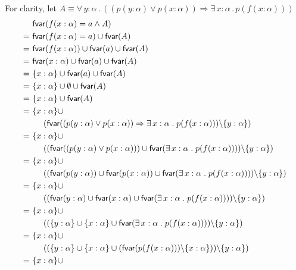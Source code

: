 \documentclass[11pt,fleqn]{article}
\newcommand{\mname}[1]{\mbox{\sf #1}}
\renewcommand{\And}{\wedge}
\newcommand{\And}{\wedge}
\newcommand{\Or}{\vee}
\newcommand{\Implies}{\Rightarrow}
\newcommand{\ForallApp}{\forall\,}
\newcommand{\ForsomeApp}{\exists\,}
\newcommand{\mdot}{\mathrel.}
\begin{document}
      For clarity, let $A \equiv \ForallApp y : \alpha \mdot ((p(y:\alpha) \Or p(x:\alpha)) \Implies \ForsomeApp x : \alpha \mdot p(f(x:\alpha)))$
    \begin{align*}
	    & \mname{fvar}( f(x:\alpha) = a \And {} A) \\
	    =~ & \mname{fvar}( f(x:\alpha) = a) \cup \mname{fvar}(A) \\
	    =~ & \mname{fvar}( f(x:\alpha)) \cup \mname{fvar}(a) \cup \mname{fvar}(A) \\
	    =~ & \mname{fvar}( x:\alpha) \cup \mname{fvar}(a) \cup \mname{fvar}(A) \\
	    =~ & \{x:\alpha\} \cup \mname{fvar}(a) \cup \mname{fvar}(A) \\
	    =~ & \{x:\alpha\} \cup \emptyset \cup \mname{fvar}(A) \\
	    =~ & \{x:\alpha\} \cup \mname{fvar}(A) \\
	    =~ & \{x:\alpha\} \cup \\
	    & ~~~~(\mname{fvar}((p(y:\alpha) \Or p(x:\alpha)) \Implies \ForsomeApp x : \alpha \mdot p(f(x:\alpha))) \backslash \{y : \alpha\}) \\
	    =~ & \{x:\alpha\} \cup \\
	    & ~~~~((\mname{fvar}((p(y:\alpha) \Or p(x:\alpha))) \cup \mname{fvar}(\ForsomeApp x : \alpha \mdot p(f(x:\alpha)))) \backslash \{y : \alpha\}) \\
	    =~ & \{x:\alpha\} \cup \\
	    & ~~~~((\mname{fvar}(p(y:\alpha)) \cup \mname{fvar}(p(x:\alpha))
	    	\cup \mname{fvar}(\ForsomeApp x : \alpha \mdot p(f(x:\alpha)))) 
	    	\backslash \{y : \alpha\}
	    	) \\
	    =~ & \{x:\alpha\} \cup \\
	    & ~~~~((\mname{fvar}(y:\alpha) \cup \mname{fvar}(x:\alpha)
	    \cup \mname{fvar}(\ForsomeApp x : \alpha \mdot p(f(x:\alpha)))) 
	    \backslash \{y : \alpha\}
	    ) \\
	    =~ & \{x:\alpha\} \cup \\
	    & ~~~~((\{y:\alpha\} \cup \{x:\alpha\}
	    \cup \mname{fvar}(\ForsomeApp x : \alpha \mdot p(f(x:\alpha)))) 
	    \backslash \{y : \alpha\}
	    ) \\
	    =~ & \{x:\alpha\} \cup \\
	    & ~~~~((\{y:\alpha\} \cup \{x:\alpha\}
	    \cup (\mname{fvar}(p(f(x:\alpha))) \backslash \{x : \alpha\}))
	    \backslash \{y : \alpha\}
	    ) \\
	    =~ & \{x:\alpha\} \cup \\

\end{align*}
\end{document}
